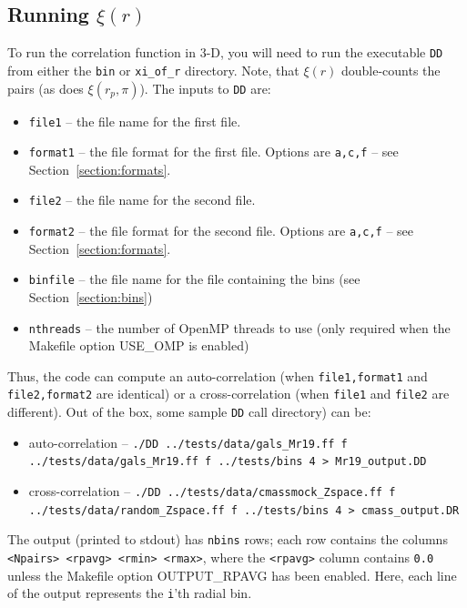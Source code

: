 \documentclass[12pt,titlepage]{article}
\newcommand{\xir}{\ensuremath{{\xi(r)}}\xspace}
\newcommand{\xirppi}{\ensuremath{{\xi(r_p,\pi)}}\xspace}
\begin{document}
\subsection{Running \texorpdfstring{\xir}{xi(r)}}
To run the correlation function in 3-D, you will need to run the executable \texttt{DD} from either the \texttt{bin} or \texttt{xi\_of\_r} directory. Note, that 
\xir double-counts the pairs (as does \xirppi). The inputs to \texttt{DD} are:
\begin{itemize}
\item \texttt{file1}   -- the file name for the first file.
\item \texttt{format1} -- the file format for the first file. Options are \texttt{a,c,f} -- see Section~\ref{section:formats}.
\item \texttt{file2}   -- the file name for the second file.
\item \texttt{format2} -- the file format for the second file. Options are \texttt{a,c,f} -- see Section~\ref{section:formats}.
\item \texttt{binfile} -- the file name for the file containing the bins (see Section~\ref{section:bins})
\item \texttt{nthreads} -- the number of OpenMP threads to use (only required when the Makefile option USE\_OMP is enabled)
\end{itemize}
Thus, the code can compute an auto-correlation (when \texttt{file1,format1} and \texttt{file2,format2} are identical) or a cross-correlation (when \texttt{file1} and \texttt{file2} are different). Out of the box, 
some sample \texttt{DD} call directory) can be:
\begin{itemize}
\item auto-correlation --  {\scriptsize \texttt{./DD  ../tests/data/gals\_Mr19.ff f ../tests/data/gals\_Mr19.ff f ../tests/bins 4 > Mr19\_output.DD}}
\item cross-correlation -- {\scriptsize \texttt{./DD ../tests/data/cmassmock\_Zspace.ff f ../tests/data/random\_Zspace.ff f ../tests/bins 4 > cmass\_output.DR}}
\end{itemize}
The output (printed to stdout) has \texttt{nbins} rows; each row contains the columns \texttt{<Npairs> <rpavg> <rmin> <rmax>}, where the \texttt{<rpavg>} column contains \texttt{0.0} unless the 
Makefile option OUTPUT\_RPAVG has been enabled. Here, each line of the output represents the \texttt{i}'th radial bin. 
\end{document}

